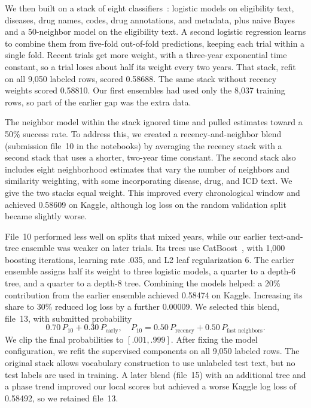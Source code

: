 \documentclass[10pt,twocolumn,letterpaper]{article}
\begin{document}
We then built on a stack of eight classifiers~\cite{wolpert1992stacked}:
logistic models on eligibility text, diseases, drug names, codes, drug
annotations, and metadata, plus naive Bayes and a 50-neighbor model on the
eligibility text. A second logistic regression learns to combine them from
five-fold out-of-fold predictions, keeping each trial within a single fold.
Recent trials get more weight, with a three-year exponential time constant, so
a trial loses about half its weight every two years. That stack, refit on all
9,050 labeled rows, scored 0.58688. The same stack without recency weights
scored 0.58810. Our first ensembles had used only the 8,037 training rows, so
part of the earlier gap was the extra data.

The neighbor model within the stack ignored time and pulled estimates toward a
50\% success rate. To address this, we created a recency-and-neighbor blend
(submission file~10 in the notebooks) by averaging the recency
stack with a second stack that uses a shorter, two-year time constant. The
second stack also includes eight neighborhood estimates that vary the number
of neighbors and similarity weighting, with some incorporating disease, drug,
and ICD text. We give the two stacks equal weight. This improved every
chronological window and achieved 0.58609 on Kaggle, although log loss on the
random validation split became slightly worse.

File~10 performed less well on splits that mixed years, while our earlier
text-and-tree ensemble was weaker on later trials. Its trees use
CatBoost~\cite{prokhorenkova2017catboost}, with 1,000 boosting iterations,
learning rate .035, and L2 leaf regularization 6.
The earlier ensemble assigns
half its weight to three logistic models, a quarter to a depth-6 tree, and a
quarter to a depth-8 tree. Combining the models helped: a 20\% contribution
from the earlier ensemble achieved 0.58474 on Kaggle. Increasing its share to
30\% reduced log loss by a further 0.00009. We selected this blend, file~13,
with submitted probability
\[
0.70\,P_{10} + 0.30\,P_{\text{early}},
\quad
P_{10} = 0.50\,P_{\text{recency}} + 0.50\,P_{\text{fast neighbors}}.
\]
We clip the final probabilities to $[.001,.999]$.
After fixing the model configuration, we refit the supervised components on all
9,050 labeled rows. The original stack allows vocabulary construction to use
unlabeled test text, but no test labels are used in training. A later blend (file~15)
with an additional tree and a phase trend improved our local scores but
achieved a worse Kaggle log loss of 0.58492, so we retained file~13.
\end{document}
